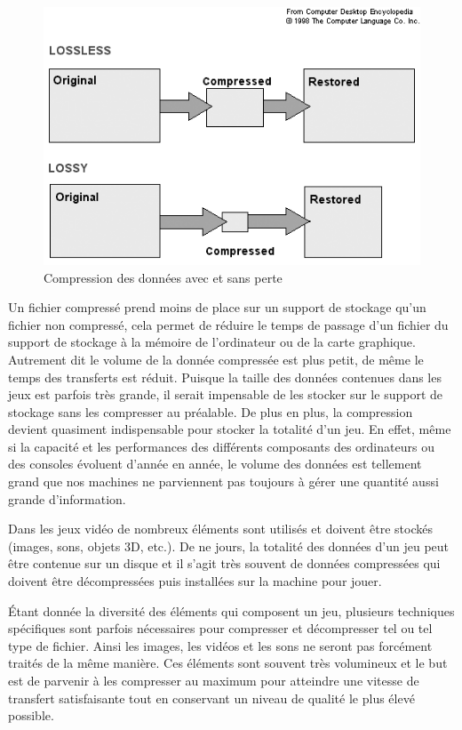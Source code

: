 \documentclass[a4paper, 11pt]{article} %
\begin{document}
\begin{figure}[!h]%
\includegraphics[width=\columnwidth]{images/data_compression.png}%
\caption{Compression des données avec et sans perte}%
\label{}%
\end{figure}

Un fichier compressé prend moins de place sur un support de stockage qu'un fichier non compressé, cela permet de réduire le temps de passage d'un fichier du support de stockage à la mémoire de l'ordinateur ou de la carte graphique. Autrement dit le volume de la donnée compressée est plus petit, de même le temps des transferts est réduit. Puisque la taille des données contenues dans les jeux est parfois très grande, il serait impensable de les stocker sur le support de stockage sans les compresser au préalable. De plus en plus, la compression devient quasiment indispensable pour stocker la totalité d'un jeu. En effet, même si la capacité et les performances des différents composants des ordinateurs ou des consoles évoluent d'année en année, le volume des données est tellement grand que nos machines ne parviennent pas toujours à gérer une quantité aussi grande d'information.

Dans les jeux vidéo de nombreux éléments sont utilisés et doivent être stockés (images, sons, objets 3D, etc.). De ne jours, la totalité des données d'un jeu peut être contenue sur un disque et il s'agit très souvent de données compressées qui doivent être décompressées puis installées sur la machine pour jouer.

Étant donnée la diversité des éléments qui composent un jeu, plusieurs techniques spécifiques sont parfois nécessaires pour compresser et décompresser tel ou tel type de fichier. Ainsi les images, les vidéos et les sons ne seront pas forcément traités de la même manière. Ces éléments sont souvent très volumineux et le but est de parvenir à les compresser au maximum pour atteindre une vitesse de transfert satisfaisante tout en conservant un niveau de qualité le plus élevé possible. 
\end{document}
